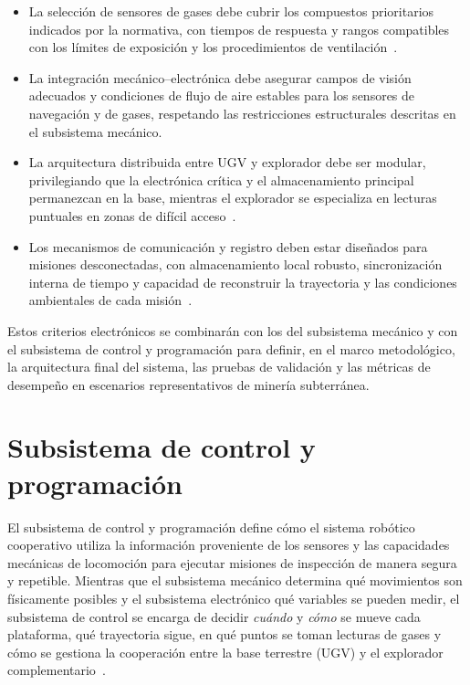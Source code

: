 \begin{itemize}
    \item La selección de sensores de gases debe cubrir los compuestos prioritarios indicados por la normativa, con tiempos de respuesta y rangos compatibles con los límites de exposición y los procedimientos de ventilación~\cite{MINEM_DS024_2016,OSINERGMIN_BoletinGSM_2020b,EU_ExposureDirective_2020}.
    \item La integración mecánico--electrónica debe asegurar campos de visión adecuados y condiciones de flujo de aire estables para los sensores de navegación y de gases, respetando las restricciones estructurales descritas en el subsistema mecánico.
    \item La arquitectura distribuida entre UGV y explorador debe ser modular, privilegiando que la electrónica crítica y el almacenamiento principal permanezcan en la base, mientras el explorador se especializa en lecturas puntuales en zonas de difícil acceso~\cite{AdvancesMining_2023}.
    \item Los mecanismos de comunicación y registro deben estar diseñados para misiones desconectadas, con almacenamiento local robusto, sincronización interna de tiempo y capacidad de reconstruir la trayectoria y las condiciones ambientales de cada misión~\cite{OSINERGMIN_BoletinGSM_2020,GEI_MinasPeru_2022}.
\end{itemize}

Estos criterios electrónicos se combinarán con los del subsistema mecánico y con el subsistema de control y programación para definir, en el marco metodológico, la arquitectura final del sistema, las pruebas de validación y las métricas de desempeño en escenarios representativos de minería subterránea.



\section{Subsistema de control y programación}
\label{sec:subsistema_control}

\hspace{1.25cm}
El subsistema de control y programación define cómo el sistema robótico cooperativo utiliza la información proveniente de los sensores y las capacidades mecánicas de locomoción para ejecutar misiones de inspección de manera segura y repetible. Mientras que el subsistema mecánico determina qué movimientos son físicamente posibles y el subsistema electrónico qué variables se pueden medir, el subsistema de control se encarga de decidir \textit{cuándo} y \textit{cómo} se mueve cada plataforma, qué trayectoria sigue, en qué puntos se toman lecturas de gases y cómo se gestiona la cooperación entre la base terrestre (UGV) y el explorador complementario~\cite{InsectInspired_2020,KimChoi_2025_MineMapping}.

